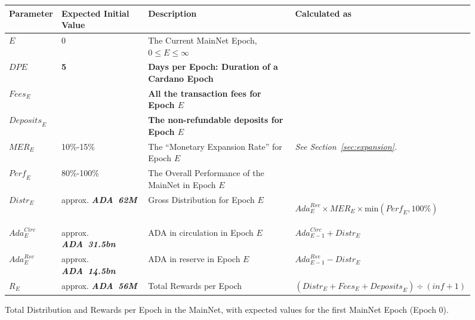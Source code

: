 \documentclass[11pt,a4paper,dvipsnames,twosided,final]{article}
\newcommand{\ada}{ADA{}}
\newcommand{\ADA}[1]{\textbf{\emph{\ada~{#1}}}}
\newcommand{\cardano}[1]{Cardano}
\begin{document}
\begin{figure}[h!]
\begin{center}
\begin{tabular}{||l|p{2.4cm}|p{6cm}|p{3.9cm}||}
  \hline \hline
\textbf{Parameter} & \textbf{Expected Initial Value} & \textbf{Description} & \textbf{Calculated as} \\\hline
$\textit{E}$ & $0$ & The Current MainNet Epoch, $0 \le E \le \infty$ & \\\hline
\textbf{\color{green} $\textit{DPE}$} & \textbf{\color{green} 5} & \textbf{\color{green} Days per Epoch: Duration of a \cardano{} Epoch} & \\\hline
\textbf{\color{cyan} $\textit{Fees}_E$} & & \textbf{\color{cyan} All the transaction fees for Epoch $E$} & \\\hline
\textbf{\color{cyan} $\textit{Deposits}_E$} & & \textbf{\color{cyan} The non-refundable deposits for Epoch $E$} & \\\hline
$\textit{MER}_E$ & 10\%-15\% &  The ``Monetary Expansion Rate'' for Epoch $E$ & \emph{See Section~\ref{sec:expansion}.} \\\hline
$\textit{Perf}_E$ & 80\%-100\% &  The Overall Performance of the MainNet in Epoch $E$ &  \\\hline
$\textit{Distr}_E$ & approx. \ADA{62M} & Gross Distribution for Epoch $E$ & \begin{flushleft}$\textit{Ada}^{\textit{Rsv}}_E \times \textit{MER}_E \times \textrm{min}(\textit{Perf}_E, 100\%)$ \end{flushleft} \\\hline
$\textit{Ada}^{\textit{Circ}}_E$ & approx. \ADA{31.5bn}  & \ada{} in circulation in Epoch $E$ & $\textit{Ada}^{\textit{Circ}}_{E-1} + \textit{Distr}_E$ \\\hline
$\textit{Ada}^{\textit{Rsv}}_E$ & approx. \ADA{14.5bn} & \ada{} in reserve in Epoch $E$ & $\textit{Ada}^{\textit{Rsv}}_{E-1} - \textit{Distr}_E$ \\\hline
$R_E$ & approx. \ADA{56M} & Total Rewards per Epoch & $ (\textit{Distr}_E + \textit{Fees}_E + \textit{Deposits}_E) \div (\textit{inf}+1)$ \\\hline
  \hline
\end{tabular}
\end{center}
\caption{Total Distribution and Rewards per Epoch in the MainNet, with expected values for the first MainNet Epoch (Epoch 0).}
\end{figure}
\end{document}
